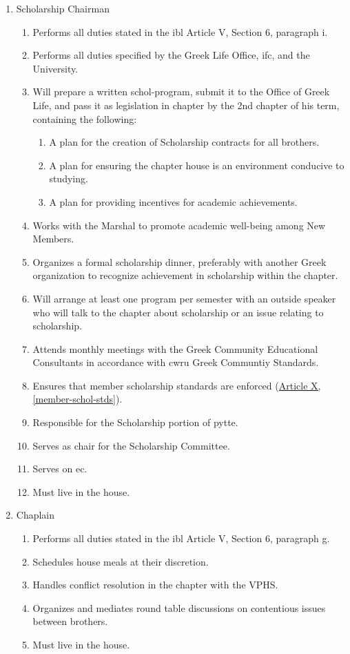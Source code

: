 \begin{enumerate}
		\item Scholarship Chairman \label{schol-chair-duties}
			\begin{enumerate}
				\item Performs all duties stated in the \gls{ibl} Article V, Section 6, paragraph i.
				\item Performs all duties specified by the Greek Life Office, \gls{ifc}, and the University.
				\item Will prepare a written \gls{schol-program}, submit it to the Office of Greek Life, and pass it as legislation in chapter by the 2nd chapter of his term, containing the following:
				\begin{enumerate}
					\item A plan for the creation of Scholarship contracts for all brothers.
					\item A plan for ensuring the chapter house is an environment conducive to studying.
					\item A plan for providing incentives for academic achievements.
				\end{enumerate}
				\item Works with the Marshal to promote academic well-being among New Members.
                \item Organizes a formal scholarship dinner, preferably with another Greek organization to recognize achievement in scholarship within the chapter.
				\item Will arrange at least one program per semester with an outside speaker who will talk to the chapter about scholarship or an issue relating to scholarship.
				\item Attends monthly meetings with the Greek Community Educational Consultants in accordance with \gls{cwru} Greek Communtiy Standards.
				\item Ensures that member scholarship standards are enforced (\hyperref[member-schol-stds]{Article X, \autoref*{member-schol-stds}}).
				\item Responsible for the Scholarship portion of \gls{pytte}.
                \item Serves as chair for the Scholarship Committee.
                \item Serves on \gls{ec}.
                \item Must live in the house.
			\end{enumerate}


		\item Chaplain
			\begin{enumerate}
				\item Performs all duties stated in the \gls{ibl} Article V, Section 6, paragraph g.
				\item Schedules house meals at their discretion.
				\item Handles conflict resolution in the chapter with the VPHS.
				\item Organizes and mediates round table discussions on contentious issues between brothers.
				\item Must live in the house.
			\end{enumerate}


\end{enumerate}
